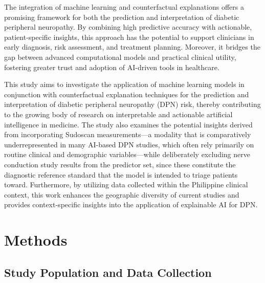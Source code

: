 \documentclass[pdflatex,sn-mathphys-num]{sn-jnl}%
\theoremstyle{thmstyleone}%
\theoremstyle{thmstyletwo}%
\theoremstyle{thmstylethree}%
\begin{document}
The integration of machine learning and counterfactual explanations offers a promising framework for both the prediction and interpretation of diabetic peripheral neuropathy. By combining high predictive accuracy with actionable, patient-specific insights, this approach has the potential to support clinicians in early diagnosis, risk assessment, and treatment planning. Moreover, it bridges the gap between advanced computational models and practical clinical utility, fostering greater trust and adoption of AI-driven tools in healthcare. 

This study aims to investigate the application of machine learning models in conjunction with counterfactual explanation techniques for the prediction and interpretation of diabetic peripheral neuropathy (DPN) risk, thereby contributing to the growing body of research on interpretable and actionable artificial intelligence in medicine. The study also examines the potential insights derived from incorporating Sudoscan measurements---a modality that is comparatively underrepresented in many AI-based DPN studies, which often rely primarily on routine clinical and demographic variables---while deliberately excluding nerve conduction study results from the predictor set, since these constitute the diagnostic reference standard that the model is intended to triage patients toward. Furthermore, by utilizing data collected within the Philippine clinical context, this work enhances the geographic diversity of current studies and provides context-specific insights into the application of explainable AI for DPN.

\section{Methods}
\label{methods}

\subsection{Study Population and Data Collection}
\label{sec:cohort}
\end{document}
